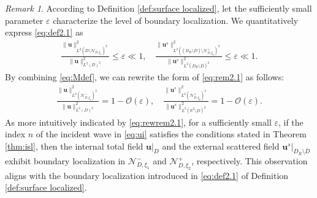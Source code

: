 \documentclass[11pt,reqno,twoside]{amsart}
\theoremstyle{definition}
\theoremstyle{remark}
\newtheorem{rem}{Remark}[section]
\numberwithin{equation}{section}
\newcommand{\bu}{\mathbf{u}}
\begin{document}
\begin{rem}
	According to Definition \ref{def:surface localized}, let the sufficiently small parameter \(\varepsilon\) characterize the level of boundary localization. We quantitatively express \eqref{eq:def2.1} as
	\begin{align}\label{eq:rem2.1}
		\frac{\|\mathbf{u}\|_{L^{2}(D \setminus \mathcal{N}_{D,\xi_{1}}^{-})^2}^{2}}{\|\mathbf{u}\|_{L^{2}(D)^2}^{2}} \leq \varepsilon\ll1, \quad \frac{\|\mathbf{u}^{s}\|_{L^{2}\left((D_R \setminus \overline{D}) \setminus \mathcal{N}_{D,\xi_{2}}^{+}\right)^2}^{2}}{\|\mathbf{u}^{s}\|_{L^{2}(D_R \setminus \overline{D})^2}^{2}} \leq \varepsilon\ll1.
	\end{align}
	By combining \eqref{eq:Mdef}, we can rewrite the form of \eqref{eq:rem2.1} as follows:
	\begin{align}\label{eq:rewrem2.1}
		\frac{\|\mathbf{u}\|_{L^2(\mathcal{N}_{D,\xi_{1}}^{-})^2}^2}{\|\mathbf{u}\|_{L^2(D)^2}^2} = 1 - \mathcal{O}\left(\varepsilon\right), \quad \frac{\|\mathbf{u}^s\|_{L^2(\mathcal{N}_{D,\xi_{2}}^{+})^2}^2}{\|\mathbf{u}^s\|_{L^2(\mathbb{R}^2 \setminus D)^2}^2} = 1 - \mathcal{O}\left(\varepsilon\right).
	\end{align}
	As more intuitively indicated by \eqref{eq:rewrem2.1}, for a sufficiently small \(\varepsilon\), if the index \(n\) of the incident wave in \eqref{eq:ui} satisfies the conditions stated in Theorem \ref{thm:isl}, then the internal total field \(\bu|_D\) and the external scattered field \(\bu^s|_{D_R \setminus \overline{D}}\) exhibit boundary localization in \(\mathcal{N}_{D,\xi_{1}}^{-}\) and \(\mathcal{N}_{D,\xi_{2}}^{+}\), respectively.
	This observation aligns with the boundary localization introduced in \eqref{eq:def2.1} of  Definition \ref{def:surface localized}.
\end{rem}
\end{document}
